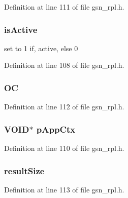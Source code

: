 Definition at line 111 of file gsn\_\-rpl.h.

\hypertarget{a00209_a5c6504268568d5da5f361d3b6f914c51}{
\subsubsection[{isActive}]{ {\bf isActive}}}
\label{a00209_a5c6504268568d5da5f361d3b6f914c51}
set to 1 if, active, else 0 

Definition at line 108 of file gsn\_\-rpl.h.

\hypertarget{a00209_a9aaa1e0a8619ea489c65aac22afbd4ad}{
\subsubsection[{OC}]{ {\bf OC}}}
\label{a00209_a9aaa1e0a8619ea489c65aac22afbd4ad}


Definition at line 112 of file gsn\_\-rpl.h.

\hypertarget{a00209_a05a138152af2aedc27575fbb40a5236a}{
\subsubsection[{pAppCtx}]{\setlength{\rightskip}{0pt plus 5cm}VOID$\ast$ {\bf pAppCtx}}}
\label{a00209_a05a138152af2aedc27575fbb40a5236a}


Definition at line 110 of file gsn\_\-rpl.h.

\hypertarget{a00209_a7e3f3db32adc602424589dfc462fd1a3}{
\subsubsection[{resultSize}]{ {\bf resultSize}}}
\label{a00209_a7e3f3db32adc602424589dfc462fd1a3}


Definition at line 113 of file gsn\_\-rpl.h.

